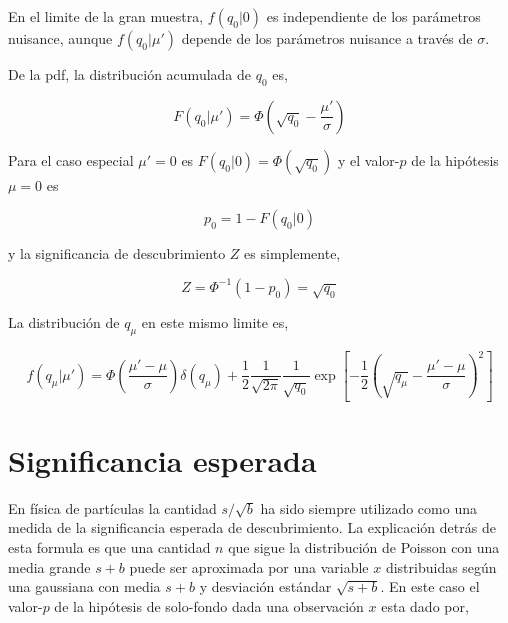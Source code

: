 En el limite de la gran muestra, $f(q_0|0)$ es independiente de los parámetros
nuisance, aunque $f(q_0|\mu')$ depende de los parámetros nuisance a través de
$\sigma$.

De la pdf, la distribución acumulada de $q_0$ es,

\begin{equation}
  F(q_0|\mu') = \Phi \left( \sqrt{q_0} - \frac{\mu'}{\sigma} \right)
\end{equation}

Para el caso especial $\mu' = 0$ es $F(q_0|0) = \Phi(\sqrt{q_0})$ y el valor-$p$
de la hipótesis $\mu=0$ es

\begin{equation}
  p_0 = 1 - F(q_0|0)
\end{equation}

y la significancia de descubrimiento $Z$ es simplemente,

\begin{equation}
  Z = \Phi^{-1} (1-p_0) = \sqrt{q_0}
\end{equation}


La distribución de $q_\mu$ en este mismo limite es,

\begin{equation}
  f(q_\mu|\mu') = \Phi\left(\frac{\mu'-\mu}{\sigma}\right) \delta(q_\mu) +
  \frac{1}{2}\frac{1}{\sqrt{2\pi}}\frac{1}{\sqrt{q_0}} \exp \left[ -\frac{1}{2}
    \left( \sqrt{q_\mu} - \frac{\mu'-\mu}{\sigma} \right)^2\right]
\end{equation}


\section{Significancia esperada} %


En física de partículas la cantidad $s/\sqrt{b}$ ha sido siempre utilizado como
una medida de la significancia esperada de descubrimiento. La explicación detrás
de esta formula es que una cantidad $n$ que sigue la distribución de Poisson con
una media grande $s+b$ puede ser aproximada por una variable $x$ distribuidas
según una gaussiana con media $s+b$ y desviación estándar $\sqrt{s+b}$. En este
caso el valor-$p$ de la hipótesis de solo-fondo dada una observación $x$ esta
dado por,

